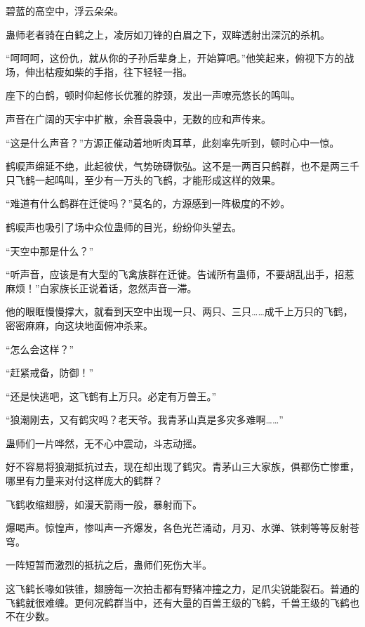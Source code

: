 
\begin{this_body}



碧蓝的高空中，浮云朵朵。

蛊师老者骑在白鹤之上，凌厉如刀锋的白眉之下，双眸透射出深沉的杀机。

“呵呵呵，这份仇，就从你的子孙后辈身上，开始算吧。”他笑起来，俯视下方的战场，伸出枯瘦如柴的手指，往下轻轻一指。

座下的白鹤，顿时仰起修长优雅的脖颈，发出一声嘹亮悠长的鸣叫。

声音在广阔的天宇中扩散，余音袅袅中，无数的应和声传来。

“这是什么声音？”方源正催动着地听肉耳草，此刻率先听到，顿时心中一惊。

鹤唳声绵延不绝，此起彼伏，气势磅礴恢弘。这不是一两百只鹤群，也不是两三千只飞鹤一起鸣叫，至少有一万头的飞鹤，才能形成这样的效果。

“难道有什么鹤群在迁徙吗？”莫名的，方源感到一阵极度的不妙。

鹤唳声也吸引了场中众位蛊师的目光，纷纷仰头望去。

“天空中那是什么？”

“听声音，应该是有大型的飞禽族群在迁徙。告诫所有蛊师，不要胡乱出手，招惹麻烦！”白家族长正说着话，忽然声音一滞。

他的眼眶慢慢撑大，就看到天空中出现一只、两只、三只……成千上万只的飞鹤，密密麻麻，向这块地面俯冲杀来。

“怎么会这样？”

“赶紧戒备，防御！”

“还是快逃吧，这飞鹤有上万只。必定有万兽王。”

“狼潮刚去，又有鹤灾吗？老天爷。我青茅山真是多灾多难啊……”

蛊师们一片哗然，无不心中震动，斗志动摇。

好不容易将狼潮抵抗过去，现在却出现了鹤灾。青茅山三大家族，俱都伤亡惨重，哪里有力量来对付这样庞大的鹤群？

飞鹤收缩翅膀，如漫天箭雨一般，暴射而下。

爆喝声。惊惶声，惨叫声一齐爆发，各色光芒涌动，月刃、水弹、铁刺等等反射苍穹。

一阵短暂而激烈的抵抗之后，蛊师们死伤大半。

这飞鹤长喙如铁锥，翅膀每一次拍击都有野猪冲撞之力，足爪尖锐能裂石。普通的飞鹤就很难缠。更何况鹤群当中，还有大量的百兽王级的飞鹤，千兽王级的飞鹤也不在少数。


\end{this_body}
